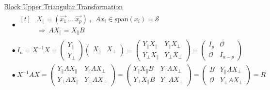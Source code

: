 \documentclass[12pt]{article}
\begin{document}
\vspace{10pt}
\underline{Block Upper Triangular Transformation}\\[10pt]
\(\begin{aligned}
	&\bullet\ \begin{aligned}[t]
			&X_\parallel = \left(\vec{x_1} \ \dots \ \vec{x_p}\right) 
				\ , \ \ Ax_i \in \text{span}(x_i) = \mathcal{S}\\[5pt]
			&\Rightarrow \ AX_\parallel = X_\parallel B
		\end{aligned}\\[5pt]
	&\bullet\ I_n = X^{-1} X = \left(\begin{matrix}
			Y_\parallel \\
			Y_\perp
		\end{matrix}\right) 
		\left(\begin{matrix}
			X_\parallel & X_\perp
		\end{matrix}\right)
		= 
		\left(\begin{matrix}
			Y_\parallel X_\parallel & Y_\parallel X_\perp\\
			Y_\perp X_\parallel & Y_\perp X_\perp
		\end{matrix}\right)
		= 
		\left(\begin{matrix}
			I_{p} & \mathcal{O}\\
			\mathcal{O} & I_{n-p}
		\end{matrix}\right)\\[10pt]
	&\bullet\ X^{-1}AX = \left(\begin{matrix}
			Y_\parallel A X_\parallel & Y_\parallel A X_\perp\\
			Y_\perp A X_\parallel & Y_\perp A X_\perp
		\end{matrix}\right)
		=
		\left(\begin{matrix}
			Y_\parallel X_\parallel B & Y_\parallel A X_\perp\\
			Y_\perp X_\parallel B & Y_\perp A X_\perp
		\end{matrix}\right)
		=
		\left(\begin{matrix}
			B & Y_\parallel A X_\perp\\
			\mathcal{O} & Y_\perp A X_\perp
		\end{matrix}\right)
		= R
\end{aligned}\)

\newpage
\end{document}
